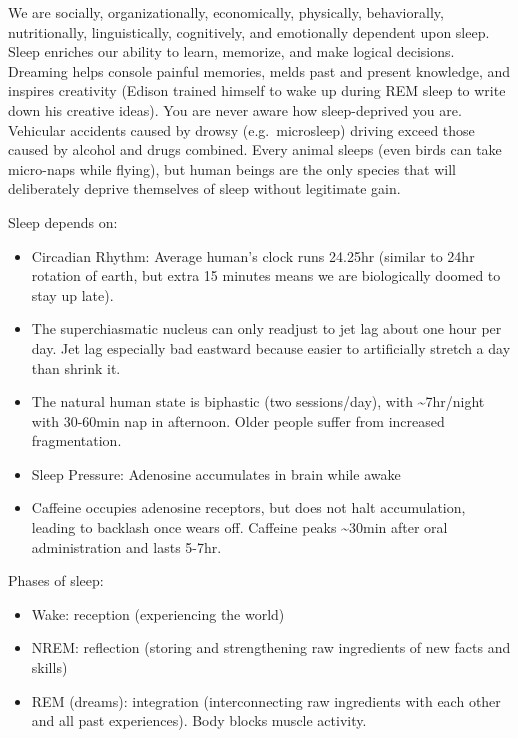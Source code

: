 \documentclass[
]{article}
\begin{document}
We are socially, organizationally, economically, physically,
behaviorally, nutritionally, linguistically, cognitively, and
emotionally dependent upon sleep. Sleep enriches our ability to learn,
memorize, and make logical decisions. Dreaming helps console painful
memories, melds past and present knowledge, and inspires creativity
(Edison trained himself to wake up during REM sleep to write down his
creative ideas). You are never aware how sleep-deprived you are.
Vehicular accidents caused by drowsy (e.g.~microsleep) driving exceed
those caused by alcohol and drugs combined. Every animal sleeps (even
birds can take micro-naps while flying), but human beings are the only
species that will deliberately deprive themselves of sleep without
legitimate gain.

Sleep depends on:

\begin{itemize}
\item
  Circadian Rhythm: Average human's clock runs 24.25hr (similar to 24hr
  rotation of earth, but extra 15 minutes means we are biologically
  doomed to stay up late).
\item
  The superchiasmatic nucleus can only readjust to jet lag about one
  hour per day. Jet lag especially bad eastward because easier to
  artificially stretch a day than shrink it.
\item
  The natural human state is biphastic (two sessions/day), with
  \textasciitilde7hr/night with 30-60min nap in afternoon. Older people
  suffer from increased fragmentation.
\item
  Sleep Pressure: Adenosine accumulates in brain while awake
\item
  Caffeine occupies adenosine receptors, but does not halt accumulation,
  leading to backlash once wears off. Caffeine peaks
  \textasciitilde30min after oral administration and lasts 5-7hr.
\end{itemize}

Phases of sleep:

\begin{itemize}
\item
  Wake: reception (experiencing the world)
\item
  NREM: reflection (storing and strengthening raw ingredients of new
  facts and skills)
\item
  REM (dreams): integration (interconnecting raw ingredients with each
  other and all past experiences). Body blocks muscle activity.
\end{itemize}
\end{document}
